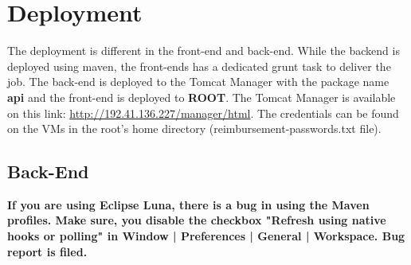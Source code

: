 \section{Deployment}
The deployment is different in the front-end and back-end. While the backend is deployed using maven, the front-ends has a dedicated grunt task to deliver the job. The back-end is deployed to the Tomcat Manager with the package name \textbf{api} and the front-end is deployed to \textbf{ROOT}.
The Tomcat Manager is available on this link:
\url{http://192.41.136.227/manager/html}. The credentials can be found on the VMs in the root's home directory (reimbursement-passwords.txt file).

\subsection{Back-End}
\textbf{If you are using Eclipse Luna, there is a bug in using the Maven profiles. Make sure, you disable the checkbox "Refresh using native hooks or polling" in Window | Preferences | General | Workspace. Bug report is filed.}\par

